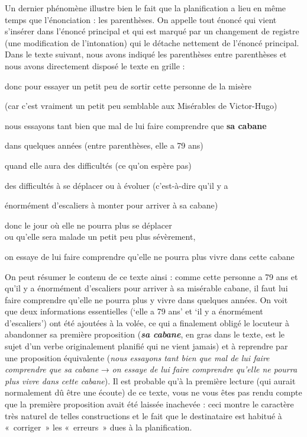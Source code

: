 Un dernier phénomène illustre bien le fait que la planification a lieu en même temps que l’énonciation : les parenthèses. On appelle  tout énoncé qui vient s’insérer dans l’énoncé principal et qui est marqué par un changement de registre (une modification de l’intonation) qui le détache nettement de l’énoncé principal. Dans le texte suivant, nous avons indiqué les parenthèses entre parenthèses et nous avons directement disposé le texte en grille :

\ea
donc pour essayer un petit peu de sortir cette personne de la misère

  (car c’est vraiment un petit peu semblable aux Misérables de Victor-Hugo)

   nous essayons tant bien que mal de lui faire comprendre que \textbf{sa cabane}

  dans quelques années (entre parenthèses, elle a 79 ans)

  quand elle aura     des difficultés (ce qu’on espère pas)

    des difficultés à se déplacer ou à évoluer (c’est-à-dire qu’il y a

   énormément d’escaliers à monter pour arriver à sa cabane)

  donc le jour    où elle ne pourra plus se déplacer \\
               ou qu’elle sera malade un petit peu plus sévèrement,

   on essaye de lui faire comprendre qu’elle ne pourra plus vivre dans cette cabane

\z

On peut résumer le contenu de ce texte ainsi : comme cette personne a 79 ans et qu’il y a énormément d’escaliers pour arriver à sa misérable cabane, il faut lui faire comprendre qu’elle ne pourra plus y vivre dans quelques années. On voit que deux informations essentielles (‘elle a 79 ans’ et ‘il y a énormément d’escaliers’) ont été ajoutées à la volée, ce qui a finalement obligé le locuteur à abandonner sa première proposition (\textbf{\textit{sa cabane}}, en gras dans le texte, est le sujet d’un verbe originalement planifié qui ne vient jamais) et à reprendre par une proposition équivalente (\textit{nous essayons tant bien que mal de lui faire comprendre que sa cabane} → \textit{on essaye de lui faire comprendre qu’elle ne pourra plus vivre dans cette cabane}). Il est probable qu’à la première lecture (qui aurait normalement dû être une écoute) de ce texte, vous ne vous êtes pas rendu compte que la première proposition avait été laissée inachevée : ceci montre le caractère très naturel de telles constructions et le fait que le destinataire est habitué à «~corriger~» les «~erreurs~» dues à la planification.

